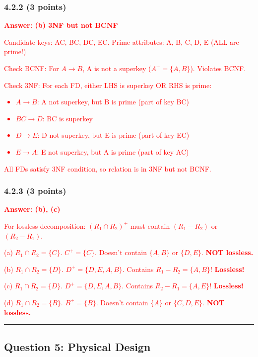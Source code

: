 \documentclass[11pt,a4paper]{article}
\begin{document}
\subsubsection*{4.2.2 (3 points)}
\textcolor{red}{\textbf{Answer: (b) 3NF but not BCNF}}

\textcolor{red}{Candidate keys: AC, BC, DC, EC. Prime attributes: A, B, C, D, E (ALL are prime!)}

\textcolor{red}{Check BCNF: For $A \rightarrow B$, A is not a superkey ($A^+ = \{A, B\}$). Violates BCNF.}

\textcolor{red}{Check 3NF: For each FD, either LHS is superkey OR RHS is prime:}
\textcolor{red}{\begin{itemize}
\item $A \rightarrow B$: A not superkey, but B is prime (part of key BC) \checkmark
\item $BC \rightarrow D$: BC is superkey \checkmark
\item $D \rightarrow E$: D not superkey, but E is prime (part of key EC) \checkmark
\item $E \rightarrow A$: E not superkey, but A is prime (part of key AC) \checkmark
\end{itemize}}
\textcolor{red}{All FDs satisfy 3NF condition, so relation is in 3NF but not BCNF.}

\subsubsection*{4.2.3 (3 points)}
\textcolor{red}{\textbf{Answer: (b), (c)}}

\textcolor{red}{For lossless decomposition: $(R_1 \cap R_2)^+$ must contain $(R_1 - R_2)$ or $(R_2 - R_1)$.}

\textcolor{red}{(a) $R_1 \cap R_2 = \{C\}$. $C^+ = \{C\}$. Doesn't contain $\{A, B\}$ or $\{D, E\}$. \textbf{NOT lossless.}}

\textcolor{red}{(b) $R_1 \cap R_2 = \{D\}$. $D^+ = \{D, E, A, B\}$. Contains $R_1 - R_2 = \{A, B\}$! \textbf{Lossless!}}

\textcolor{red}{(c) $R_1 \cap R_2 = \{D\}$. $D^+ = \{D, E, A, B\}$. Contains $R_2 - R_1 = \{A, E\}$! \textbf{Lossless!}}

\textcolor{red}{(d) $R_1 \cap R_2 = \{B\}$. $B^+ = \{B\}$. Doesn't contain $\{A\}$ or $\{C, D, E\}$. \textbf{NOT lossless.}}

\hrule
\vspace{1em}

\subsection*{Question 5: Physical Design}
\end{document}
